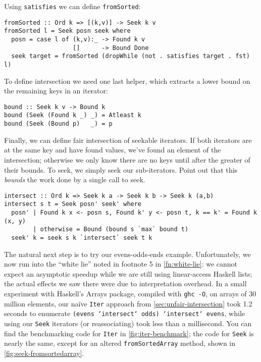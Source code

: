 \documentclass[acmsmall,screen,dvipsnames,svgnames]{acmart}
\newcommand\hask[1]{\texttt{#1}}
\newcommand\ttt\texttt
\newcommand\todo[1]{{\color{Orange}#1}}
\renewcommand\todo[1]{{\color{IndianRed}#1}}
\newcommand\oldtodo[1]{\todo{#1}}
\begin{document}
\noindent
Using \ttt{satisfies} we can define \ttt{fromSorted}:

\begin{verbatim}
fromSorted :: Ord k => [(k,v)] -> Seek k v
fromSorted l = Seek posn seek where
  posn = case l of (k,v):_ -> Found k v
                   []      -> Bound Done
  seek target = fromSorted (dropWhile (not . satisfies target . fst) l)
\end{verbatim}

\noindent
To define intersection we need one last helper, which extracts a lower bound on the remaining keys in an iterator:

\begin{verbatim}
bound :: Seek k v -> Bound k
bound (Seek (Found k _) _) = Atleast k
bound (Seek (Bound p)   _) = p
\end{verbatim}

\noindent
Finally, we can define fair intersection of seekable iterators.
If both iterators are at the same key and have found values, we've found an element of the intersection; otherwise we only know there are no keys until after the greater of their bounds.
To seek, we simply seek our sub-iterators.
\oldtodo{Point out that this \emph{bounds} the work done by a single call to seek.}

\begin{verbatim}
intersect :: Ord k => Seek k a -> Seek k b -> Seek k (a,b)
intersect s t = Seek posn' seek' where
  posn' | Found k x <- posn s, Found k' y <- posn t, k == k' = Found k (x, y)
        | otherwise = Bound (bound s `max` bound t)
  seek' k = seek s k `intersect` seek t k
\end{verbatim}

\noindent
The natural next step is to try our evens-odds-ends example.
Unfortunately, we now run into the ``white lie'' noted in footnote 5 in \cref{fn:white-lie}:
we cannot expect an asymptotic speedup while we are still using linear-access Haskell lists; the actual effects we saw there were due to interpretation overhead.
In a small experiment with Haskell's Arrays package, compiled with \ttt{ghc -O}, on arrays of 30 million elements, our na\"ive \hask{Iter} approach from \cref{sec:unfair-intersection} took 1.2 seconds to enumerate \ttt{(evens `intersect` odds) `intersect` evens}, while using our \hask{Seek} iterators (or reassociating) took less than a millisecond.
You can find the benchmarking code for \hask{Iter} in \cref{fig:iter-benchmark}; the code for \hask{Seek} is nearly the same, except for an altered \ttt{fromSortedArray} method, shown in \cref{fig:seek-fromsortedarray}.
\end{document}
